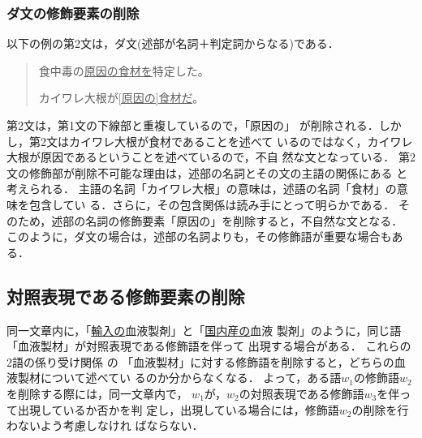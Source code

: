 \subsubsection{ダ文の修飾要素の削除}
\label{sakujo_meishi_hanteishi}
以下の例の第2文は，ダ文(述部が名詞＋判定詞からなる)である．
\vspace{5mm}\begin{quote}\label{rei:rei9}
\hspace*{-1em}{\bf 例9：}\par
 食中毒の\underline{原因の食材を}特定した。

 カイワレ大根が\underline{[原因の]食材だ}。
\end{quote}\vspace{5mm}
第2文は，第1文の下線部と重複しているので，「原因の」
が削除される．しかし，第2文はカイワレ大根が食材であることを述べて
いるのではなく，カイワレ大根が原因であるということを述べているので，不自
然な文となっている．
第2文の修飾部が削除不可能な理由は，述部の名詞とその文の主語の関係にある
と考えられる．
主語の名詞「カイワレ大根」の意味は，述語の名詞「食材」の意味を包含してい
る．さらに，その包含関係は読み手にとって明らかである．
そのため，述部の名詞の修飾要素「原因の」を削除すると，不自然な文となる．
このように，ダ文の場合は，述部の名詞よりも，その修飾語が重要な場合もある．


\subsection{対照表現である修飾要素の削除} \label{sakujo_souhan}
同一文章内に，「\underline{輸入の}血液製剤」と「\underline{国内産の}血液
製剤」のように，同じ語「血液製材」が対照表現である修飾語を伴って
出現する場合がある．
これらの2語の係り受け関係
の
「血液製材」に対する修飾語を削除すると，どちらの血液製材について述べてい
るのか分からなくなる．
よって，ある語$w_1$の修飾語$w_2$を削除する際には，同一文章内で，
$w_1$が，$w_2$の対照表現である修飾語$w_3$を伴って出現しているか否かを判
定し，出現している場合には，修飾語$w_2$の削除を行わないよう考慮しなけれ
ばならない．

